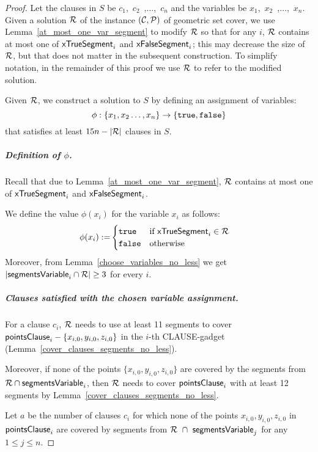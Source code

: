 \begin{proof}\leavevmode
Let the clauses in $S$ be $c_1$,~$c_2$~,$\ldots$,~$c_n$
and the variables be $x_1$,~$x_2$~,$\ldots$,~$x_n$.
Given a solution $\mathcal{R}$
of the instance $(\mathcal{C}, \mathcal{P})$ of geometric set cover,
we use Lemma~\ref{at_most_one_var_segment} to modify $\mathcal{R}$
so that for any $i$, $\mathcal{R}$ contains at most
one of $\mathsf{xTrueSegment}_{i}$ and $\mathsf{xFalseSegment}_{i}$;
this may decrease the size of $\mathcal{R}$,
but that does not matter in the subsequent construction.
To simplify notation,
in the remainder of this proof we use $\mathcal{R}$ to refer to the modified solution.

Given $\mathcal{R}$, we construct a solution to $S$ by defining an
assignment of variables:
$$\phi : \{ x_1, x_2 \ldots, x_n\} \rightarrow \{\texttt{true}, \texttt{false}\}$$
that satisfies at least $15n-|\mathcal{R}|$ clauses in $S$.

\subparagraph{Definition of $\phi$.}
Recall that due to Lemma~\ref{at_most_one_var_segment},
$\mathcal{R}$ contains at most one of $\mathsf{xTrueSegment}_{i}$ and $\mathsf{xFalseSegment}_{i}$.

We define the value $\phi(x_i)$ for the variable $x_i$ as follows:
\begin{align}
	\begin{split}
	\label{eqn:variable_assignment}
	\phi(x_i) := & \begin{cases}
	\texttt{true} & \text{if}\ \mathsf{xTrueSegment}_{i} \in \mathcal{R} \\
	\texttt{false} & \text{otherwise}
	\end{cases}
	\end{split}
\end{align}
Moreover, from Lemma~\ref{choose_variables_no_less} we get $|\mathsf{segmentsVariable}_{i} \cap \mathcal{R}| \ge 3$ for every $i$.

\subparagraph{Clauses satisfied with the chosen variable assignment.}

For a clause $c_i$,
$\mathcal{R}$ needs to use at least 11 segments to cover $\mathsf{pointsClause}_{i} - \{x_{i,0}, y_{i,0}, z_{i,0}\}$
in the $i$-th CLAUSE-gadget (Lemma~\ref{cover_clauses_segments_no_less}).

Moreover, if none of the points $\{x_{i,0}, y_{i,0}, z_{i,0}\}$
are covered by the segments from $\mathcal{R} \cap \mathsf{segmentsVariable}_{i}$,
then $\mathcal{R}$ needs to cover $\mathsf{pointsClause}_{i}$
with at least 12 segments
by Lemma~\ref{cover_clauses_segments_no_less}.

Let $a$ be the number of clauses $c_i$ for which none of
the points $x_{i,0}, y_{i,0}, z_{i,0}$ in $\mathsf{pointsClause}_{i}$ are covered by
segments from $\mathcal{R}~\cap~\mathsf{segmentsVariable}_{j}$ for any $1 \le j \le n$.


\end{proof}
